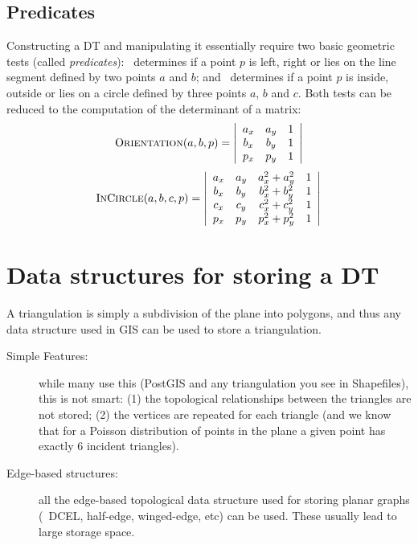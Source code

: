 \subsection{Predicates}%
\label{sec:predicates}
Constructing a DT and manipulating it essentially require two basic geometric tests (called \emph{predicates}): \Orient\ determines if a point $p$ is left, right or lies on the line segment defined by two points $a$ and $b$; and \Incircle\ determines if a point $p$ is inside, outside or lies on a circle defined by three points $a$, $b$ and $c$. 
Both tests can be reduced to the computation of the determinant of a matrix:
\begin{equation}
  \textrm{O}\textsc{rientation}(a, b, p) = 
  \left| 
  \begin{array}{cccc}
    a_{x} & a_{y} & 1 \\
    b_{x} & b_{y} & 1 \\
    p_{x} & p_{y} & 1 
  \end{array} 
  \right| 
\end{equation}
\begin{equation}
  \textrm{I}\textsc{n}\textrm{C}\textsc{ircle}(a, b, c, p) = 
  \left| 
  \begin{array}{ccccc}
    a_{x} & a_{y} & a^{2}_{x} + a^{2}_{y} & 1 \\
    b_{x} & b_{y} & b^{2}_{x} + b^{2}_{y} & 1 \\
    c_{x} & c_{y} & c^{2}_{x} + c^{2}_{y} & 1 \\
    p_{x} & p_{y} & p^{2}_{x} + p^{2}_{y} & 1 
  \end{array} 
  \right|%
\label{eq:insphere}
\end{equation}


\section[DT data structures]{Data structures for storing a DT}

A triangulation is simply a subdivision of the plane into polygons, and thus any data structure used in GIS can be used to store a triangulation.

\begin{description}
  \item[Simple Features:] while many use this (PostGIS and any triangulation you see in Shapefiles), this is not smart: (1) the topological relationships between the triangles are not stored; (2) the vertices are repeated for each triangle (and we know that for a Poisson distribution of points in the plane a given point has exactly 6 incident triangles).
  \item[Edge-based structures:] all the edge-based topological data structure used for storing planar graphs (\eg\ DCEL, half-edge, winged-edge, etc) can be used. These usually lead to large storage space.
\end{description}

